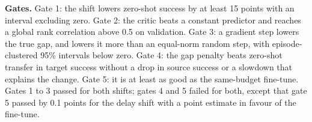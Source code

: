 \textbf{Gates.} Gate 1: the shift lowers zero-shot success by at least 15 points with an interval excluding zero. Gate 2: the critic beats a constant predictor and reaches a global rank correlation above 0.5 on validation. Gate 3: a gradient step lowers the true gap, and lowers it more than an equal-norm random step, with episode-clustered 95\% intervals below zero. Gate 4: the gap penalty beats zero-shot transfer in target success without a drop in source success or a slowdown that explains the change. Gate 5: it is at least as good as the same-budget fine-tune. Gates 1 to 3 passed for both shifts; gates 4 and 5 failed for both, except that gate 5 passed by 0.1 points for the delay shift with a point estimate in favour of the fine-tune.


